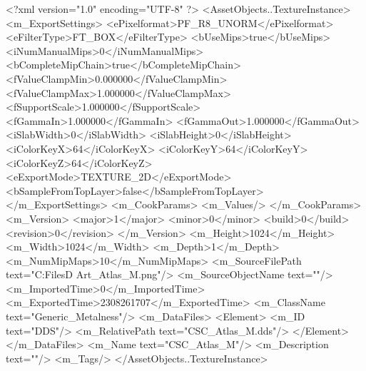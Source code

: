 <?xml version="1.0" encoding="UTF-8" ?>
<AssetObjects..TextureInstance>
	<m_ExportSettings>
		<ePixelformat>PF_R8_UNORM</ePixelformat>
		<eFilterType>FT_BOX</eFilterType>
		<bUseMips>true</bUseMips>
		<iNumManualMips>0</iNumManualMips>
		<bCompleteMipChain>true</bCompleteMipChain>
		<fValueClampMin>0.000000</fValueClampMin>
		<fValueClampMax>1.000000</fValueClampMax>
		<fSupportScale>1.000000</fSupportScale>
		<fGammaIn>1.000000</fGammaIn>
		<fGammaOut>1.000000</fGammaOut>
		<iSlabWidth>0</iSlabWidth>
		<iSlabHeight>0</iSlabHeight>
		<iColorKeyX>64</iColorKeyX>
		<iColorKeyY>64</iColorKeyY>
		<iColorKeyZ>64</iColorKeyZ>
		<eExportMode>TEXTURE_2D</eExportMode>
		<bSampleFromTopLayer>false</bSampleFromTopLayer>
	</m_ExportSettings>
	<m_CookParams>
		<m_Values/>
	</m_CookParams>
	<m_Version>
		<major>1</major>
		<minor>0</minor>
		<build>0</build>
		<revision>0</revision>
	</m_Version>
	<m_Height>1024</m_Height>
	<m_Width>1024</m_Width>
	<m_Depth>1</m_Depth>
	<m_NumMipMaps>10</m_NumMipMaps>
	<m_SourceFilePath text="C:\Users\Shadow\Desktop\Working Files\3D Art\Textures\CSC_Atlas_M.png"/>
	<m_SourceObjectName text=""/>
	<m_ImportedTime>0</m_ImportedTime>
	<m_ExportedTime>2308261707</m_ExportedTime>
	<m_ClassName text="Generic_Metalness"/>
	<m_DataFiles>
		<Element>
			<m_ID text="DDS"/>
			<m_RelativePath text="CSC_Atlas_M.dds"/>
		</Element>
	</m_DataFiles>
	<m_Name text="CSC_Atlas_M"/>
	<m_Description text=""/>
	<m_Tags/>
</AssetObjects..TextureInstance>

